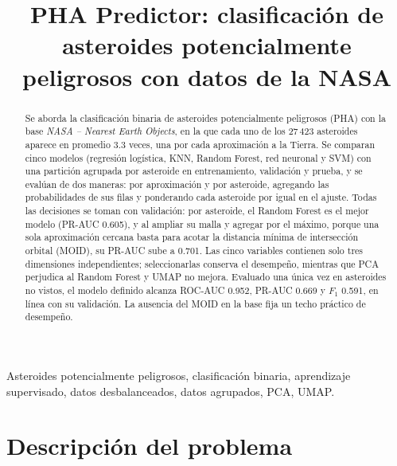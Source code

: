 \documentclass[conference]{IEEEtran}
\begin{document}
\title{PHA Predictor: clasificación de asteroides potencialmente peligrosos con datos de la NASA}

\author{
}

\maketitle

\begin{abstract}
Se aborda la clasificación binaria de asteroides potencialmente peligrosos (PHA) con la base \emph{NASA -- Nearest Earth Objects}, en la que cada uno de los 27\,423 asteroides aparece en promedio 3.3 veces, una por cada aproximación a la Tierra. Se comparan cinco modelos (regresión logística, KNN, Random Forest, red neuronal y SVM) con una partición agrupada por asteroide en entrenamiento, validación y prueba, y se evalúan de dos maneras: por aproximación y por asteroide, agregando las probabilidades de sus filas y ponderando cada asteroide por igual en el ajuste. Todas las decisiones se toman con validación: por asteroide, el Random Forest es el mejor modelo (PR-AUC 0.605), y al ampliar su malla y agregar por el máximo, porque una sola aproximación cercana basta para acotar la distancia mínima de intersección orbital (MOID), su PR-AUC sube a 0.701. Las cinco variables contienen solo tres dimensiones independientes; seleccionarlas conserva el desempeño, mientras que PCA perjudica al Random Forest y UMAP no mejora. Evaluado una única vez en asteroides no vistos, el modelo definido alcanza ROC-AUC 0.952, PR-AUC 0.669 y $F_1$ 0.591, en línea con su validación. La ausencia del MOID en la base fija un techo práctico de desempeño.
\end{abstract}

\begin{IEEEkeywords}
Asteroides potencialmente peligrosos, clasificación binaria, aprendizaje supervisado, datos desbalanceados, datos agrupados, PCA, UMAP.
\end{IEEEkeywords}

\section{Descripción del problema}
\end{document}
